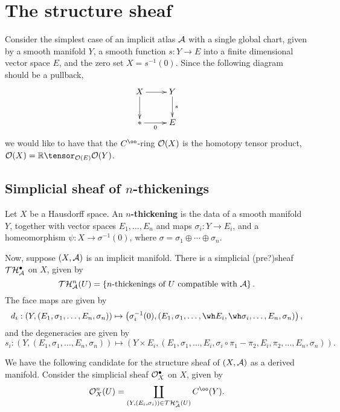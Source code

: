 
\section{The structure sheaf}

Consider the simplest case of an implicit atlas $\mathcal A$ with a single global chart, given by a smooth manifold $Y$, a smooth function $s: Y \to E$ into a finite dimensional vector space $E$, and the zero set $X = s^{-1}(0)$. Since the following diagram should be a pullback,
\[ \xymatrix{X \ar[r] \ar[d] & Y \ar[d]^-{s} \\ {*} \ar[r]_-{0} & E}\]
we would like to have that the $C^\oo$-ring $\mathcal O(X)$ is the homotopy tensor product, $\cO(X) = \RR \tensor_{\cO(E)} \cO(Y)$.

\subsection{Simplicial sheaf of $n$-thickenings}

\begin{defn}
Let $X$ be a Hausdorff space. An {\bf $n$-thickening} is the data of a smooth manifold $Y$, together with vector spaces $E_1, \dots, E_n$ and maps $\sigma_i: Y \to E_i$, and a homeomorphism $\psi: X \to \sigma^{-1}(0)$, where $\sigma = \sigma_1 \oplus \cdots \oplus \sigma_n$.
\end{defn}

Now, suppose $(X, \mathcal A)$ is an implicit manifold.  There is a simplicial (pre?)sheaf $\mathcal T \mathcal H_\mathcal A^\bullet$ on $X$, given by
\[ \mathcal T \mathcal H_\mathcal A^n(U) = \left\{ \text{$n$-thickenings of $U$ compatible with $\mathcal A$} \right\}. \]
The face maps are given by
\[ d_i : \left( Y, (E_1, \sigma_1, \dots, E_n, \sigma_n) \right) \mapsto \left( \sigma_i^{-1}(0), (E_1, \sigma_1, \dots, \wh E_i, \wh \sigma_i, \dots , E_n, \sigma_n) \right), \]
and the degeneracies are given by
\[ s_i : \left( Y, (E_1, \sigma_1, \dots, E_n, \sigma_n) \right) \mapsto \left( Y \times E_i, (E_1, \sigma_1, \dots, E_i, \sigma_i \circ \pi_1 - \pi_2, E_i, \pi_2, \dots, E_n, \sigma_n) \right). \]

We have the following candidate for the structure sheaf of $(X, \mathcal A)$ as a derived manifold. Consider the simplicial sheaf $\mathcal O_X^\bullet$ on $X$, given by
\[ \cO_X^n(U) = \coprod_{(Y, (E_i, \sigma_i)) \in \cT \cH_\cA^n(U)} C^\oo(Y). \]
